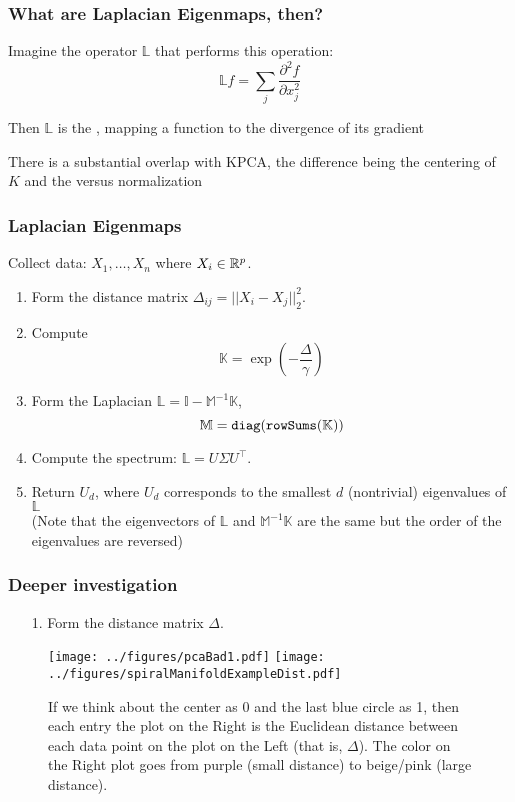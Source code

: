 \documentclass{beamer}
\begin{document}
\begin{frame}[fragile]
\frametitle{What are Laplacian Eigenmaps, then?}
Imagine the operator $\mathbb{L}$ that performs this operation:
\[
\mathbb{L} f = \sum_{j} \frac{\partial^2 f}{\partial x_j^2}
\]
\vsp

Then $\mathbb{L}$ is the , mapping a function to the 
divergence of its gradient
\vsp


\vsp
{} There is a substantial overlap with KPCA, the difference being the centering of $K$
and the  versus  normalization
\end{frame}

\begin{frame}
  \frametitle{Laplacian Eigenmaps}
  Collect data: $X_1,\ldots,X_n$ where $X_i\in\mathbb{R}^p$.
  \vsp

  \begin{enumerate}
  \item Form the distance matrix $\Delta_{ij} =  ||X_i-X_j||_2^2$.
  \item Compute
    \[
    \mathbb{K} = \exp\left(-\frac{\Delta}{\gamma}
    \right)
    \]
  \item Form the Laplacian $\mathbb{L} = \mathbb{I} -
    \mathbb{M}^{-1}\mathbb{K}$, 
    \[ 
    \mathbb{M} = {\tt      diag(rowSums(\mathbb{K}))}
    \] 
  \item Compute the spectrum: $\mathbb{L} = U\Sigma U^\top$.
  \item Return $U_d$, where $U_d$ corresponds to the smallest $d$ (nontrivial) eigenvalues of
 $\mathbb{L}$\\
    {\scriptsize (Note that the eigenvectors of $\mathbb{L}$ and
      $\mathbb{M}^{-1}\mathbb{K}$ are the same but the order of the eigenvalues are reversed)}
  \end{enumerate}
\end{frame}



\begin{frame}[fragile]
\frametitle{Deeper investigation}
\begin{itemize}
\item[1.] Form the distance matrix $\Delta$.
\end{itemize}
\begin{figure}
\centering
\texttt{[image: ../figures/pcaBad1.pdf]}
\texttt{[image: ../figures/spiralManifoldExampleDist.pdf]}
\caption{If we think about the center as 0 and the last blue circle as
  1, then each entry the plot on the Right is the Euclidean distance
  between each data point on the plot on the Left (that is,
  $\Delta$). The color on the Right plot goes from purple (small
  distance) to beige/pink (large distance). }   
\end{figure}
\end{frame}
\end{document}
